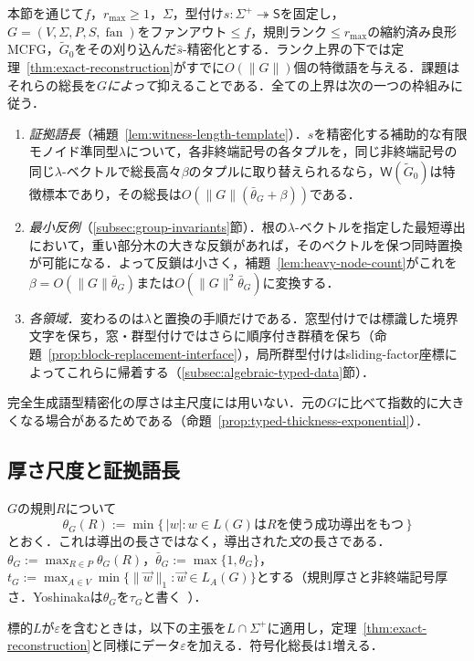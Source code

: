 \documentclass[11pt,a4paper]{ltjsarticle}
\numberwithin{equation}{section}
\theoremstyle{plain}
\theoremstyle{definition}
\theoremstyle{remark}
\newcommand{\Wit}{\mathsf{W}}
\newcommand{\tuple}[1]{\vec{#1}}
\newcommand{\eps}{\varepsilon}
\newcommand{\fan}{\operatorname{fan}}
\begin{document}
本節を通じて$f$，$r_{\max}\ge1$，$\Sigma$，型付け$s:\Sigma^+\twoheadrightarrow\mathsf S$を固定し，$G=(V,\Sigma,P,S,\fan)$をファンアウト$\le f$，規則ランク$\le r_{\max}$の縮約済み良形MCFG，$\widetilde G_0$をその刈り込んだ$\widehat s$-精密化とする．ランク上界の下では定理~\ref{thm:exact-reconstruction}がすでに$O(\|G\|)$個の特徴語を与える．課題はそれらの総長を\emph{$G$によって}抑えることである．全ての上界は次の一つの枠組みに従う．
\begin{enumerate}[label=\textup{(\arabic*)},leftmargin=*]
\item \emph{証拠語長}（補題~\ref{lem:witness-length-template}）．$s$を精密化する補助的な有限モノイド準同型$\lambda$について，各非終端記号の各タプルを，同じ非終端記号の同じ$\lambda$-ベクトルで総長高々$\beta$のタプルに取り替えられるなら，$\Wit(\widetilde G_0)$は特徴標本であり，その総長は$O(\|G\|(\bar\theta_G+\beta))$である．
\item \emph{最小反例}（\ref{subsec:group-invariants}節）．根の$\lambda$-ベクトルを指定した最短導出において，重い部分木の大きな反鎖があれば，そのベクトルを保つ同時置換が可能になる．よって反鎖は小さく，補題~\ref{lem:heavy-node-count}がこれを$\beta=O(\|G\|\bar\theta_G)$または$O(\|G\|^2\bar\theta_G)$に変換する．
\item \emph{各領域}．変わるのは$\lambda$と置換の手順だけである．窓型付けでは標識した境界文字を保ち，窓・群型付けではさらに順序付き群積を保ち（命題~\ref{prop:block-replacement-interface}），局所群型付けはsliding-factor座標によってこれらに帰着する（\ref{subsec:algebraic-typed-data}節）．
\end{enumerate}
完全生成語型精密化の厚さは主尺度には用いない．元の$G$に比べて指数的に大きくなる場合があるためである（命題~\ref{prop:typed-thickness-exponential}）．

\subsection{厚さ尺度と証拠語長}
\label{subsec:thickness-contexts}

$G$の規則$R$について
\[
 \theta_G(R):=\min\{\,|w|:w\in L(G)\text{は}R\text{を使う成功導出をもつ}\,\}
\]
とおく．これは導出の長さではなく，導出された\emph{文}の長さである．$\theta_G:=\max_{R\in P}\theta_G(R)$，$\bar\theta_G:=\max\{1,\theta_G\}$，$t_G:=\max_{A\in V}\min\{\|\tuple w\|_1:\tuple w\in L_A(G)\}$とする（規則厚さと非終端記号厚さ．Yoshinakaは$\theta_G$を$\tau_G$と書く~\cite[Section~4.3]{Yoshinaka2011}）．


標的$L$が$\eps$を含むときは，以下の主張を$L\cap\Sigma^+$に適用し，定理~\ref{thm:exact-reconstruction}と同様にデータ$\eps$を加える．符号化総長は1増える．
\end{document}
